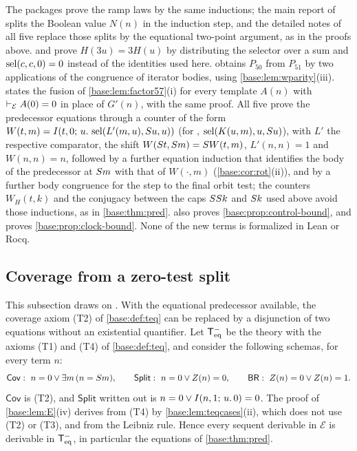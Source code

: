 \begin{remark}
The packages prove the ramp laws by the same inductions; the main report of
 splits the Boolean value $N(n)$ in the induction
step, and the detailed notes of all five replace those splits by the
equational two-point argument, as in the proofs above.
 and  prove $H(3u)=3H(u)$
by distributing the selector over a sum and $\operatorname{sel}(c,c,0)=0$ instead of the
identities used here.   obtains $P_{50}$ from
$P_{51}$ by two applications of the congruence of iterator bodies, using
\cref{base:lem:wparity}(iii).   states the fusion of
\cref{base:lem:factor57}(i) for every template $A(n)$ with
$\vdash_{\mathcal E}A(0)=0$ in place of $G'(n)$, with the same proof.  All
five prove the predecessor equations through a counter of the form
$W(t,m)=I(t,0;\,u.\,\operatorname{sel}(L'(m,u),S u,u))$ (for ,
$\operatorname{sel}(K(u,m),u,S u)$), with $L'$ the respective comparator, the shift
$W(S t,S m)=S W(t,m)$, $L'(n,n)=1$ and $W(n,n)=n$, followed by a
further equation induction that identifies the body of the predecessor at
$S m$ with that of $W(\cdot,m)$ (\cref{base:cor:rot}(ii)), and by a
further body congruence for the step to the final orbit test; the counters
$W_H(t,k)$ and the conjugacy between the caps $SS k$ and $S k$ used
above avoid those inductions, as in \cref{base:thm:pred}.
 also proves \cref{base:prop:control-bound}, and
 proves \cref{base:prop:clock-bound}.  None of the new
terms is formalized in Lean or Rocq.
\end{remark}

\subsection{Coverage from a zero-test split}
\label{base:sec:split}

This subsection draws on .  With the equational
predecessor available, the coverage axiom (T2) of \cref{base:def:teq} can
be replaced by a disjunction of two equations without an existential
quantifier.  Let $\mathsf{T}_{\mathrm{eq}}^{-}$ be the theory with the axioms (T1) and (T4)
of \cref{base:def:teq}, and consider the following schemas, for every
term $n$:
\[
 \mathsf{Cov}:\ n=0\vee\exists m\,(n=S m),\qquad
 \mathsf{Split}:\ n=0\vee Z(n)=0,\qquad
 \mathsf{BR}:\ Z(n)=0\vee Z(n)=1 .
\]
$\mathsf{Cov}$ is (T2), and $\mathsf{Split}$ written out is
$n=0\vee I(n,1;\,u.\,0)=0$.  The proof of \cref{base:lem:E}(iv) derives
 from (T4) by \cref{base:lem:teqcases}(ii), which does not use
(T2) or (T3), and  from the Leibniz rule.  Hence every
sequent derivable in $\mathcal E$ is derivable in $\mathsf{T}_{\mathrm{eq}}^{-}$, in particular
the equations of \cref{base:thm:pred}.

